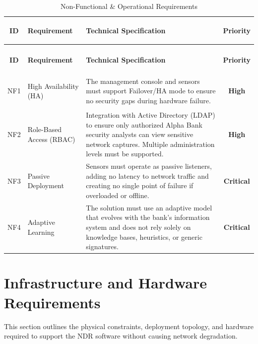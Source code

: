 \documentclass[12pt,a4paper]{report}
\newcommand{\critical}{\textbf{Critical}}
\newcommand{\high}{\textbf{High}}
\begin{document}
\captionsetup{singlelinecheck=false, justification=raggedright}
\renewcommand{\arraystretch}{1.4}

\begin{xltabular}{\textwidth}{c >{\bfseries\raggedright\arraybackslash}p{3cm} >{\raggedright\arraybackslash}X c}
    
    \caption{Non-Functional \& Operational Requirements}
    \label{tab:nonfunctional} \\
    \toprule
    \textbf{ID} & \textbf{Requirement} & \textbf{Technical Specification} & \textbf{Priority} \\
    \midrule
    \endfirsthead
    
     \\
    \toprule
    \textbf{ID} & \textbf{Requirement} & \textbf{Technical Specification} & \textbf{Priority} \\
    \midrule
    \endhead
    
  
    
    \bottomrule
    \endlastfoot
    
    NF1 & High Availability (HA) &
    The management console and sensors must support Failover/HA mode to ensure no security gaps during hardware failure. & \high \\
    
    NF2 & Role-Based Access (RBAC) &
    Integration with Active Directory (LDAP) to ensure only authorized Alpha Bank security analysts can view sensitive network captures. Multiple administration levels must be supported. & \high \\
    
    NF3 & Passive Deployment &
    Sensors must operate as passive listeners, adding no latency to network traffic and creating no single point of failure if overloaded or offline. & \critical \\
    
    NF4 & Adaptive Learning &
    The solution must use an adaptive model that evolves with the bank's information system and does not rely solely on knowledge bases, heuristics, or generic signatures. & \critical \\
    
\end{xltabular}

\section{Infrastructure and Hardware Requirements}
This section outlines the physical constraints, deployment topology, and hardware required to support the NDR software without causing network degradation.
\end{document}
